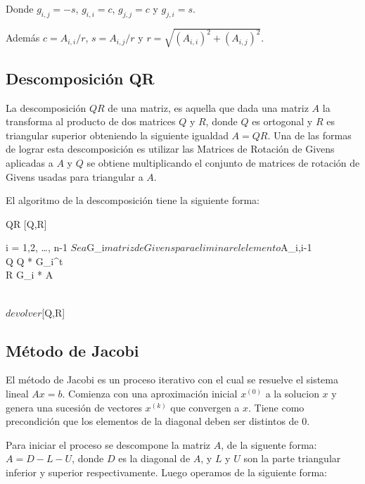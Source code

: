 Donde $g_{i, j} = -s$, $g_{i, i} = c$, $g_{j, j} = c$ y $g_{j, i} = s$.

Además $c = A_{i, i} / r$, $s = A_{i, j} / r$ y $r = \sqrt{(A_{i, i})^2 + (A_{i, j})^2}$.

\subsection{Descomposición QR}

La descomposición $QR$ de una matriz, es aquella que dada una matriz $A$ la transforma al producto de dos matrices $Q$ y $R$, donde $Q$ es ortogonal y $R$ es triangular superior obteniendo la siguiente igualdad $A = QR$. Una de las formas de lograr esta descomposición es utilizar las Matrices de Rotación de Givens aplicadas a $A$ y $Q$ se obtiene multiplicando el conjunto de matrices de rotación de Givens usadas para triangular a $A$.

\newpage

El algoritmo de la descomposición tiene la siguiente forma:

\begin{algorithm}{QR}{} {\param{}{[Q,R]}{}}
	[Q,R] \leftarrow [I,A]\\
	\begin{FOR}{ i = 1,2, \ldots , n-1}
		$Sea $G_i$ matriz de Givens para eliminar el elemento $A_{i,i-1}\\
		Q \leftarrow Q * G_i^t\\
		R \leftarrow G_i * A
	\end{FOR}\\
	$devolver $[Q,R]
\end{algorithm}

\subsection{Método de Jacobi}

El método de Jacobi es un proceso iterativo con el cual se resuelve el sistema lineal $Ax =  b$. Comienza con una aproximación inicial $x^{(0)}$ a la solucion $x$ y genera una sucesión de vectores $x^{(k)}$ que convergen a $x$. Tiene como precondición que los elementos de la diagonal deben ser distintos de $0$.

Para iniciar el proceso se descompone la matriz $A$, de la siguente forma: $A = D - L - U$, donde $D$ es la diagonal de $A$, y $L$ y $U$ son la parte triangular inferior y superior respectivamente. Luego operamos de la siguiente forma:

